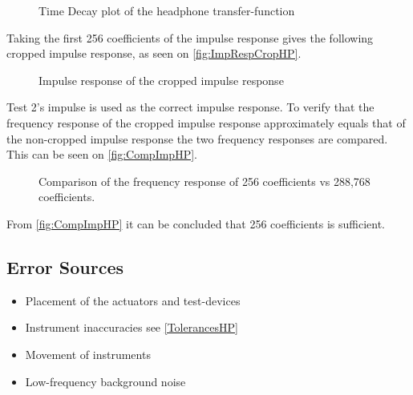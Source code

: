 \begin{figure}[H]
	\centering
	
	\caption{Time Decay plot of the headphone transfer-function}
	\label{TimeDecayPlotHeadphone}
\end{figure}

Taking the first 256 coefficients of the impulse response gives the following cropped impulse response, as seen on \autoref{fig:ImpRespCropHP}.

\begin{figure}[H]
	\centering
	
	\caption{Impulse response of the cropped impulse response}
	\label{fig:ImpRespCropHP}
\end{figure}

Test 2's impulse is used as the correct impulse response. To verify that the frequency response of the cropped impulse response approximately equals that of the non-cropped impulse response the two frequency responses are compared. This can be seen on \autoref{fig:CompImpHP}.

\begin{figure}[H]
	\centering
	
	\caption{Comparison of the frequency response of 256 coefficients vs 288,768 coefficients.}
	\label{fig:CompImpHP}
\end{figure}

From \autoref{fig:CompImpHP} it can be concluded that 256 coefficients is sufficient.


\subsection{Error Sources}
\begin{itemize}
	\item Placement of the actuators and test-devices
	\item Instrument inaccuracies see \autoref{TolerancesHP}
	\item Movement of instruments
	\item Low-frequency background noise
\end{itemize}

